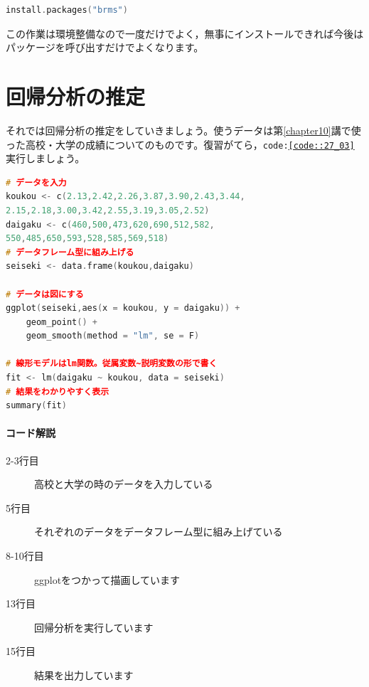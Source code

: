 \documentclass{ltjbook}
\begin{document}
\begin{lstlisting}[language=c++,label={code::27_02},caption={パッケージを入れる}]
install.packages("brms")
\end{lstlisting}

この作業は環境整備なので一度だけでよく，無事にインストールできれば今後はパッケージを呼び出すだけでよくなります。
\section{回帰分析の推定}
それでは回帰分析の推定をしていきましょう。使うデータは第\ref{chapter10}講で使った高校・大学の成績についてのものです。復習がてら，\texttt{code:\ref{code::27_03}}実行しましょう。
\begin{lstlisting}[language=c++,label={code::27_03},caption={回帰分析をやってみる}]
# データを入力
koukou <- c(2.13,2.42,2.26,3.87,3.90,2.43,3.44,
2.15,2.18,3.00,3.42,2.55,3.19,3.05,2.52)
daigaku <- c(460,500,473,620,690,512,582,
550,485,650,593,528,585,569,518)
# データフレーム型に組み上げる
seiseki <- data.frame(koukou,daigaku)

# データは図にする
ggplot(seiseki,aes(x = koukou, y = daigaku)) +
    geom_point() +
    geom_smooth(method = "lm", se = F)

# 線形モデルはlm関数。従属変数~説明変数の形で書く
fit <- lm(daigaku ~ koukou, data = seiseki)
# 結果をわかりやすく表示
summary(fit)
\end{lstlisting}

\paragraph{コード解説}
\begin{description}
    \item[2-3行目] 高校と大学の時のデータを入力している
    \item[5行目] それぞれのデータをデータフレーム型に組み上げている
    \item[8-10行目] ggplotをつかって描画しています
    \item[13行目] 回帰分析を実行しています
    \item[15行目] 結果を出力しています
\end{description}
\end{document}
